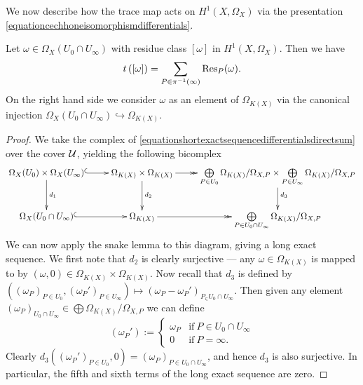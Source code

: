 We now describe how the trace map acts on $H^1(X,\Omega_X)$ via the presentation \eqref{equationcechhoneisomorphismdifferentials}.
    \begin{lem}\label{lemmatracemaplemma}
    Let $ \omega \in \Omega_X(U_0 \cap U_\infty)$ with residue class $[\omega]$ in $H^1(X,\Omega_X)$.
    Then we have
        \[
        t\left([ \omega ]\right) = \sum_{P \in \pi^{-1}(\infty)}\operatorname{Res}_P(\omega).
        \]
    On the right hand side we consider $\omega$ as an element of $\Omega_{K(X)}$ via the canonical injection $\Omega_X(U_0 \cap U_\infty) \hookrightarrow \Omega_{K(X)}$.
    \end{lem}
    \begin{proof}
    We take the \cech complex of \eqref{equationshortexactsequencedifferentialsdirectsum} over the cover ${\mathcal U}$, yielding the following bicomplex
        \begin{equation}\label{equationdualitycommutativediagramdifferentials}
        \xymatrix{\Omega_X(U_0)\times\Omega_X(U_\infty) \ar@{^{(}->}[r] \ar[d]^{d_1} & \Omega_{K(X)} \times \Omega_{K(X)} \ar[d]^{d_2} \ar@{->>}[r] & \bigoplus \limits_{P \in U_0} \Omega_{K(X)}/\Omega_{X,P} \times \bigoplus \limits_{P \in U_\infty} \Omega_{K(X)}/\Omega_{X,P} \ar[d]^{d_3} \\
        \Omega_X(U_0 \cap U_\infty) \ar@{^{(}->}[r]  & \Omega_{K(X)} \ar@{->>}[r] & \bigoplus \limits_{P\in U_0 \cap U_\infty} \Omega_{K(X)}/\Omega_{X,P} }
        \end{equation}
    We can now apply the snake lemma to this diagram, giving a long exact sequence.
    We first note that $d_2$ is clearly surjective --- any $\omega \in \Omega_{K(X)}$ is mapped to by $(\omega, 0) \in \Omega_{K(X)} \times \Omega_{K(X)}$.
    Now recall that $d_3$ is defined by $((\omega_P)_{P \in U_0}, (\omega_P')_{P \in U_\infty}) \mapsto (\omega_P - \omega_P')_{P_ \in U_0 \cap U_\infty}$.
    Then given any element $(\omega_P)_{U_0 \cap U_\infty} \in \bigoplus \Omega_{K(X)}/\Omega_{X,P}$ we can define
        \[
        (\omega_P') := 
            \begin{cases}
            \omega_P & \text{if}\ P \in U_0 \cap U_\infty \\
            0 & \text{if} \ P = \infty.
            \end{cases}
        \]  
    Clearly $d_3((\omega_P')_{P \in U_0}, 0) = (\omega_P)_{P \in U_0 \cap U_\infty}$, and hence $d_3$ is also surjective.
    In particular, the fifth and sixth terms of the long exact sequence are zero.

\end{proof}
